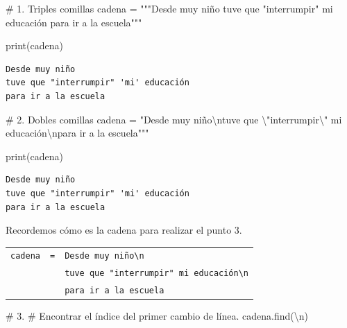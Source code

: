 \documentclass[
  spanish,
  letterpaper,
]{scrbook}
\newenvironment{Shaded}{\begin{snugshade}}{\end{snugshade}}
\newcommand{\BuiltInTok}[1]{\textcolor[rgb]{0.00,0.23,0.31}{#1}}
\newcommand{\CharTok}[1]{\textcolor[rgb]{0.13,0.47,0.30}{#1}}
\newcommand{\CommentTok}[1]{\textcolor[rgb]{0.37,0.37,0.37}{#1}}
\newcommand{\NormalTok}[1]{\textcolor[rgb]{0.00,0.23,0.31}{#1}}
\newcommand{\OperatorTok}[1]{\textcolor[rgb]{0.37,0.37,0.37}{#1}}
\newcommand{\StringTok}[1]{\textcolor[rgb]{0.13,0.47,0.30}{#1}}
\theoremstyle{definition}
\theoremstyle{remark}
\begin{document}
\begin{Shaded}
\begin{Highlighting}[]
\CommentTok{\# 1. Triples comillas}
\NormalTok{cadena }\OperatorTok{=} \StringTok{"""Desde muy niño}
\StringTok{tuve que "interrumpir" \textquotesingle{}mi\textquotesingle{} educación}
\StringTok{para ir a la escuela"""}

\BuiltInTok{print}\NormalTok{(cadena)}
\end{Highlighting}
\end{Shaded}

\begin{verbatim}
Desde muy niño
tuve que "interrumpir" 'mi' educación
para ir a la escuela
\end{verbatim}

\begin{Shaded}
\begin{Highlighting}[]
\CommentTok{\# 2. Dobles comillas}
\NormalTok{cadena }\OperatorTok{=} \StringTok{"Desde muy niño}\CharTok{\textbackslash{}n}\StringTok{tuve que }\CharTok{\textbackslash{}"}\StringTok{interrumpir}\CharTok{\textbackslash{}"}\StringTok{ \textquotesingle{}mi\textquotesingle{} educación}\CharTok{\textbackslash{}n}\StringTok{para ir a la escuela"""}

\BuiltInTok{print}\NormalTok{(cadena)}
\end{Highlighting}
\end{Shaded}

\begin{verbatim}
Desde muy niño
tuve que "interrumpir" 'mi' educación
para ir a la escuela
\end{verbatim}

Recordemos cómo es la cadena para realizar el punto 3.

\begin{longtable}[]{@{}rcl@{}}
\toprule\noalign{}
\endhead
\bottomrule\noalign{}
\endlastfoot
\texttt{cadena} & \texttt{=} &
\texttt{Desde\ muy\ niño\textbackslash{}n} \\
& &
\texttt{tuve\ que\ "interrumpir"\ \textquotesingle{}mi\textquotesingle{}\ educación\textbackslash{}n} \\
& & \texttt{para\ ir\ a\ la\ escuela} \\
\end{longtable}

\begin{Shaded}
\begin{Highlighting}[]
\CommentTok{\# 3.}
\CommentTok{\# Encontrar el índice del primer cambio de línea.}
\NormalTok{cadena.find(}\StringTok{\textquotesingle{}}\CharTok{\textbackslash{}n}\StringTok{\textquotesingle{}}\NormalTok{)}
\end{Highlighting}
\end{Shaded}
\end{document}
